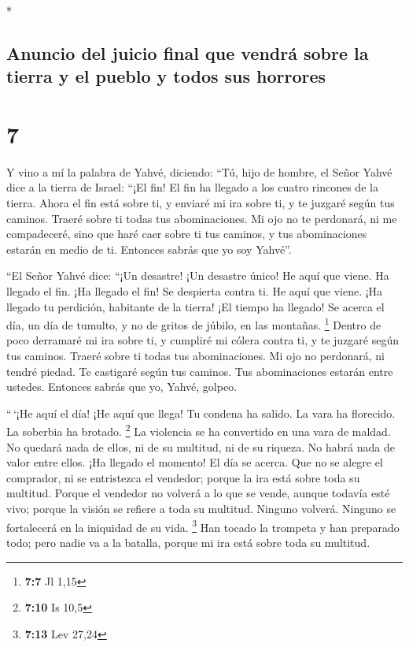 \begin{paracol}{2}
\begin{otherlanguage}{english}
\end{otherlanguage}

\switchcolumn[0]*

\hypertarget{anuncio-del-juicio-final-que-vendruxe1-sobre-la-tierra-y-el-pueblo-y-todos-sus-horrores}{%
\subsection{Anuncio del juicio final que vendrá sobre la tierra y el
pueblo y todos sus
horrores}\label{anuncio-del-juicio-final-que-vendruxe1-sobre-la-tierra-y-el-pueblo-y-todos-sus-horrores}}

\hypertarget{section-12}{%
\section{7}\label{section-12}}

 Y vino a mí la palabra de Yahvé, diciendo: 
``Tú, hijo de hombre, el Señor Yahvé dice a la tierra de Israel: ``¡El
fin! El fin ha llegado a los cuatro rincones de la tierra.
 Ahora el fin está sobre ti, y enviaré mi ira sobre ti, y
te juzgaré según tus caminos. Traeré sobre ti todas tus abominaciones.
 Mi ojo no te perdonará, ni me compadeceré, sino que haré
caer sobre ti tus caminos, y tus abominaciones estarán en medio de ti.
Entonces sabrás que yo soy Yahvé''.

 ``El Señor Yahvé dice: ``¡Un desastre! ¡Un desastre
único! He aquí que viene.  Ha llegado el fin. ¡Ha llegado
el fin! Se despierta contra ti. He aquí que viene.  ¡Ha
llegado tu perdición, habitante de la tierra! ¡El tiempo ha llegado! Se
acerca el día, un día de tumulto, y no de gritos de júbilo, en las
montañas. \footnote{\textbf{7:7} Jl 1,15}  Dentro de poco
derramaré mi ira sobre ti, y cumpliré mi cólera contra ti, y te juzgaré
según tus caminos. Traeré sobre ti todas tus abominaciones.
 Mi ojo no perdonará, ni tendré piedad. Te castigaré según
tus caminos. Tus abominaciones estarán entre ustedes. Entonces sabrás
que yo, Yahvé, golpeo.

 ``\,`¡He aquí el día! ¡He aquí que llega! Tu condena ha
salido. La vara ha florecido. La soberbia ha brotado. \footnote{\textbf{7:10}
  Is 10,5}  La violencia se ha convertido en una vara de
maldad. No quedará nada de ellos, ni de su multitud, ni de su riqueza.
No habrá nada de valor entre ellos.  ¡Ha llegado el
momento! El día se acerca. Que no se alegre el comprador, ni se
entristezca el vendedor; porque la ira está sobre toda su multitud.
 Porque el vendedor no volverá a lo que se vende, aunque
todavía esté vivo; porque la visión se refiere a toda su multitud.
Ninguno volverá. Ninguno se fortalecerá en la iniquidad de su vida.
\footnote{\textbf{7:13} Lev 27,24}  Han tocado la
trompeta y han preparado todo; pero nadie va a la batalla, porque mi ira
está sobre toda su multitud.


\end{paracol}
